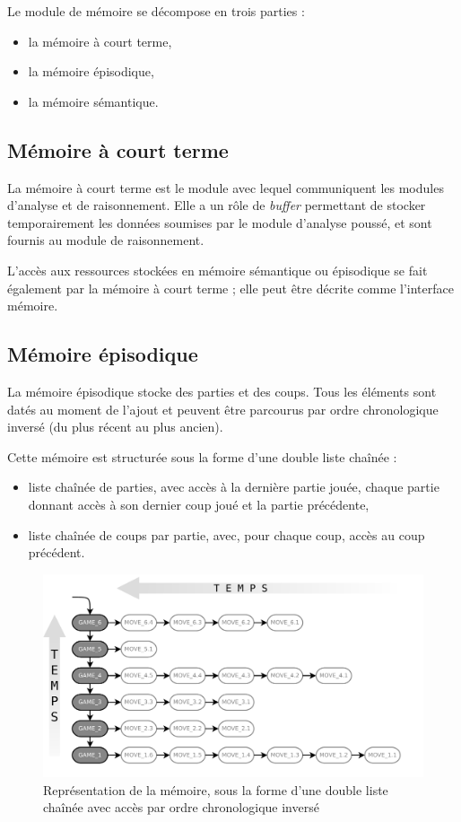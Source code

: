 Le module de mémoire se décompose en trois parties :
\begin{itemize}
\item la mémoire à court terme,
\item la mémoire épisodique,
\item la mémoire sémantique.
\end{itemize}

\subsection{Mémoire à court terme}

La mémoire à court terme est le module avec lequel communiquent les modules d'analyse et de raisonnement. Elle a un rôle de \emph{buffer} permettant de stocker temporairement les données soumises par le module d'analyse poussé, et sont fournis au module de raisonnement.

L'accès aux ressources stockées en mémoire sémantique ou épisodique se fait également par la mémoire à court terme ; elle peut être décrite comme l'interface mémoire.

\subsection{Mémoire épisodique}
\label{conception_memoire_episodique}

La mémoire épisodique stocke des parties et des coups. Tous les éléments sont datés au moment de l'ajout et peuvent être parcourus par ordre chronologique inversé (du plus récent au plus ancien).

Cette mémoire est structurée sous la forme d'une double liste chaînée :
\begin{itemize}
\item liste chaînée de parties, avec accès à la dernière partie jouée, chaque partie donnant accès à son dernier coup joué et la partie précédente,
\item liste chaînée de coups par partie, avec, pour chaque coup, accès au coup précédent.
\end{itemize}

\begin{figure}[H]
\includegraphics[width=\textwidth]{files/memoire/episodic_general}
\caption{Représentation de la mémoire, sous la forme d'une double liste chaînée avec accès par ordre chronologique inversé}
\end{figure}

